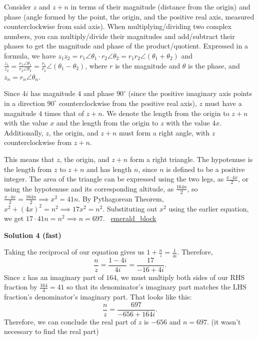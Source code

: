 \begin{enumerate}
 Consider $z$ and $z+n$ in terms of their magnitude (distance from the origin) and phase (angle formed by the point, the origin, and the positive real axis, measured counterclockwise from said axis). When multiplying/dividing two complex numbers, you can multiply/divide their magnitudes and add/subtract their phases to get the magnitude and phase of the product/quotient. Expressed in a formula, we have $z_1z_2 = r_1\angle\theta_1 \cdot r_2\angle\theta_2 = r_1r_2\angle(\theta_1+\theta_2)$ and $\frac{z_1}{z_2} = \frac{r_1\angle\theta_1}{r_2\angle\theta_2} = \frac{r_1}{r_2}\angle(\theta_1-\theta_2)$, where $r$ is the magnitude and $\theta$ is the phase, and $z_n=r_n\angle\theta_n$.

 Since $4i$ has magnitude $4$ and phase $90^\circ$ (since the positive imaginary axis points in a direction $90^\circ$ counterclockwise from the positive real axis), $z$ must have a magnitude $4$ times that of $z+n$. We denote the length from the origin to $z+n$ with the value $x$ and the length from the origin to $z$ with the value $4x$. Additionally, $z$, the origin, and $z+n$ must form a right angle, with $z$ counterclockwise from $z+n$.

 This means that $z$, the origin, and $z+n$ form a right triangle. The hypotenuse is the length from $z$ to $z+n$ and has length $n$, since $n$ is defined to be a positive integer. The area of the triangle can be expressed using the two legs, as $\frac{x \cdot 4x}{2}$, or using the hypotenuse and its corresponding altitude, as $\frac{164n}{2}$, so $\frac{x \cdot 4x}{2} = \frac{164n}{2} \implies x^2 = 41n$. By Pythagorean Theorem, $x^2+(4x)^2 = n^2 \implies 17x^2 = n^2$. Substituting out $x^2$ using the earlier equation, we get $17\cdot41n = n^2 \implies n = \boxed{697}$. ~\href{https://artofproblemsolving.com/wiki/index.php?title=User:Emerald\_block}{emerald\_block}

 



\textbf{Solution 4 (fast)}

Taking the reciprocal of our equation gives us $1 + \frac{n}{z} = \frac{1}{4i}.$ Therefore, 
 \[\frac{n}{z} = \frac{1-4i}{4i} = \frac{17}{-16+4i}.\] Since $z$ has an imaginary part of $164$, we must multiply both sides of our RHS fraction by $\frac{164}{4} = 41$ so that its denominator's imaginary part matches the LHS fraction's denominator's imaginary part. That looks like this:
 \[\frac{n}{z} = \frac{697}{-656 + 164i}.\] Therefore, we can conclude the real part of $z$ is $-656$ and $n = \boxed{697}.$ (it wasn't necessary to find the real part)


\end{enumerate}
